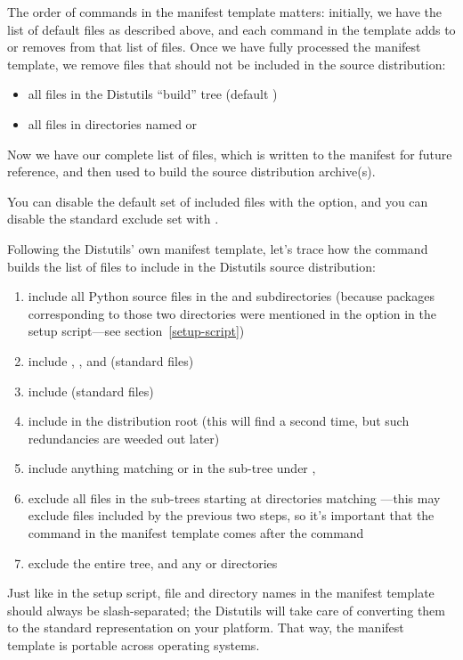 \documentclass{howto}
\begin{document}
The order of commands in the manifest template matters: initially, we
have the list of default files as described above, and each command in
the template adds to or removes from that list of files.  Once we have
fully processed the manifest template, we remove files that should not
be included in the source distribution:
\begin{itemize}
\item all files in the Distutils ``build'' tree (default )
\item all files in directories named  or 
\end{itemize}
Now we have our complete list of files, which is written to the manifest
for future reference, and then used to build the source distribution
archive(s).

You can disable the default set of included files with the
 option, and you can disable the standard
exclude set with .

Following the Distutils' own manifest template, let's trace how the
 command builds the list of files to include in the
Distutils source distribution:
\begin{enumerate}
\item include all Python source files in the  and
   subdirectories (because packages
  corresponding to those two directories were mentioned in the
   option in the setup script---see
  section~\ref{setup-script})
\item include , , and 
  (standard files)
\item include  (standard files)
\item include  in the distribution root (this will find
   a second time, but such redundancies are weeded out
  later)
\item include anything matching  or  in the
  sub-tree under ,
\item exclude all files in the sub-trees starting at directories
  matching ---this may exclude files
  included by the previous two steps, so it's important that the
   command in the manifest template comes after the
   command
\item exclude the entire  tree, and any  or
   directories
\end{enumerate}
Just like in the setup script, file and directory names in the manifest
template should always be slash-separated; the Distutils will take care
of converting them to the standard representation on your platform.
That way, the manifest template is portable across operating systems.
\end{document}
